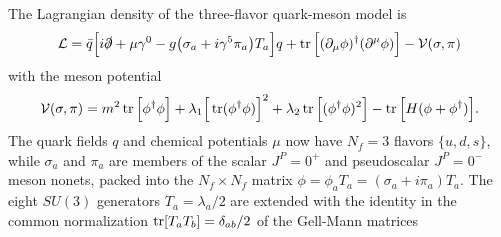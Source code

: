 The Lagrangian density of the three-flavor quark-meson model is \cite{ref:lsm3f,ref:lsm3f_details}
\begin{equation}
	\mathcal{L} = \bar{q} \Big[ i \slashed\partial + \mu \gamma^0 - g \big(\sigma_a + i \gamma^5 \pi_a\big) T_a \Big] q + \operatorname{tr}\Big[(\partial_\mu \phi)^\dagger (\partial^\mu \phi)\Big] - \mathcal{V}(\sigma, \pi)
\label{eq:lsm:lagrangian3f}
\end{equation}
with the meson potential
\begin{equation}
	\mathcal{V}(\sigma, \pi) = m^2 \operatorname{tr}\Big[\phi^\dagger \phi\Big] + \lambda_1 \Big[\operatorname{tr}(\phi^\dagger \phi)\Big]^2 + \lambda_2 \operatorname{tr}\Big[(\phi^\dagger \phi)^2\Big] - \operatorname{tr}\Big[H(\phi+\phi^\dagger)\Big].
\label{eq:lsm:potential3f}
\end{equation}
The quark fields $q$ and chemical potentials $\mu$ now have $N_f=3$ flavors $\{u,d,s\}$,
while $\sigma_a$ and $\pi_a$ are members of the scalar $J^P=0^+$ and pseudoscalar $J^P=0^-$ meson nonets,
packed into the $N_f \times N_f$ matrix $\phi = \phi_a T_a = (\sigma_a + i \pi_a) T_a$.
The eight $SU(3)$ generators $T_a = \lambda_a/2$ are extended with the identity in the common normalization $\operatorname{tr}[T_a T_b] = \delta_{ab}/2$ of the Gell-Mann matrices
